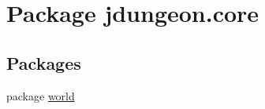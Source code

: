 \hypertarget{namespacejdungeon_1_1core}{
\section{Package jdungeon.core}
\label{namespacejdungeon_1_1core}
}
\subsection*{Packages}
\begin{DoxyCompactItemize}
\item 
package \hyperlink{namespacejdungeon_1_1core_1_1world}{world}
\end{DoxyCompactItemize}
